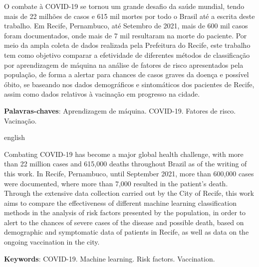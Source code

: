 
\begin{resumo}[Resumo] 
O combate à COVID-19 se tornou um grande desafio da saúde mundial, tendo mais de 22 milhões de casos e 615 mil mortes por todo o Brasil até a escrita deste trabalho. Em Recife, Pernambuco, até Setembro de 2021, mais de 600 mil casos foram documentados, onde mais de 7 mil resultaram na morte do paciente. Por meio da ampla coleta de dados realizada pela Prefeitura do Recife, este trabalho tem como objetivo comparar a efetividade de diferentes métodos de classificação por aprendizagem de máquina na análise de fatores de risco apresentados pela população, de forma a alertar para chances de casos graves da doença e possível óbito, se baseando nos dados demográficos e sintomáticos dos pacientes de Recife, assim como dados relativos à vacinação em progresso na cidade.

 \vspace{\onelineskip}
    
 \noindent
 \textbf{Palavras-chaves}: Aprendizagem de máquina. COVID-19. Fatores de risco. Vacinação.
\end{resumo}



\begin{resumo}[Abstract]
\begin{otherlanguage*}{english}

Combating COVID-19 has become a major global health challenge, with more than 22 million cases and 615,000 deaths throughout Brazil as of the writing of this work. In Recife, Pernambuco, until September 2021, more than 600,000 cases were documented, where more than 7,000 resulted in the patient's death. Through the extensive data collection carried out by the City of Recife, this work aims to compare the effectiveness of different machine learning classification methods in the analysis of risk factors presented by the population, in order to alert to the chances of severe cases of the disease and possible death, based on demographic and symptomatic data of patients in Recife, as well as data on the ongoing vaccination in the city. 



   \vspace{\onelineskip} 
 
   \noindent 
   \textbf{Keywords}: COVID-19. Machine learning. Risk factors. Vaccination. 
 \end{otherlanguage*}
 \end{resumo}
